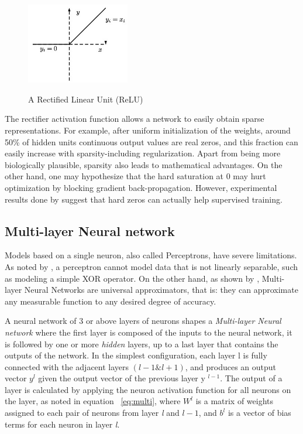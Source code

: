 \begin{figure}[H]
	\centering
	{\includegraphics[width=0.4\textwidth]{images/relu}}
	\caption{A Rectified Linear Unit (ReLU)}
	\label{fig:relu}
\end{figure}

\indent The rectifier activation function allows a network to easily obtain sparse representations. For example, after uniform initialization of the weights, around 50\% of hidden units continuous output values are real zeros, and this fraction can easily increase with sparsity-including regularization. Apart from being more biologically plausible, sparsity also leads to mathematical advantages. On the other hand, one may hypothesize that the hard saturation at 0 may hurt optimization by blocking gradient back-propagation. However, experimental results done by\citeauthor{glorot2011deep} suggest that hard zeros can actually help supervised training\cite{glorot2011deep}.  


\subsection{Multi-layer Neural network}

Models based on a single neuron, also called Perceptrons, have severe limitations. As noted by \citeauthor{preparata2012computational}, a perceptron cannot model data that is not linearly separable, such as modeling a simple XOR operator. On the other hand, as shown by \citealt{hornik1989multilayer}, Multi-layer Neural Networks are universal approximators, that is: they can approximate any measurable function to any desired degree of accuracy.


A neural network of 3 or above layers of neurons shapes a \textit{Multi-layer Neural network} where the first layer is composed of the inputs to the neural network, it is followed by one or more \textit{hidden} layers, up to a last layer that contains the outputs of the network. In the simplest configuration, each layer l is fully connected with the adjacent layers $(l - 1 \& l + 1)$, and produces an output vector $y^{l}$ given the output vector of the previous layer y $^{l-1}$. The output of a layer is calculated by applying the neuron activation function for all neurons on the layer, as noted in equation ~\ref{eq:multi}, where $W^{l}$ is a matrix of weights assigned to each pair of neurons from layer \textit{l} and $l - 1$, and $b^{l}$ is a vector of bias terms for each neuron in layer \textit{l}.

